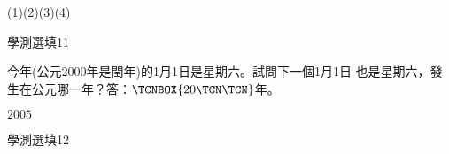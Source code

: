 \begin{QUESTIONS}
\begin{QUESTION}
\begin{QBODY}
\begin{QOPS}
				\end{QOPS}
        \end{QBODY}
        \begin{QFROMS}
        \end{QFROMS}
        \begin{QTAGS}\end{QTAGS}
        \begin{QANS}
			(1)(2)(3)(4)
        \end{QANS}
        \begin{QSOLLIST}
        \end{QSOLLIST}
        \begin{QEMPTYSPACE}
        \end{QEMPTYSPACE}
    \end{QUESTION}
\end{QUESTIONS}\begin{QUESTIONS}
    \begin{QUESTION}
        \begin{ExamInfo}{89}{學測}{選填}{11}
        \end{ExamInfo}
        \begin{ExamAnsRateInfo}{}{}{}{}
        \end{ExamAnsRateInfo}
        \begin{QBODY}
			今年(公元2000年是閏年)的1月1日是星期六。試問下一個1月1日
			也是星期六，發生在公元哪一年？答：$\TCNBOX{20\TCN\TCN}$年。
		\end{QBODY}
        \begin{QFROMS}
        \end{QFROMS}
        \begin{QTAGS}\end{QTAGS}
        \begin{QANS}
			$2005$
        \end{QANS}
        \begin{QSOLLIST}
        \end{QSOLLIST}
        \begin{QEMPTYSPACE}
        \end{QEMPTYSPACE}
    \end{QUESTION}
    \begin{QUESTION}
        \begin{ExamInfo}{89}{學測}{選填}{12}
        \end{ExamInfo}
        \begin{ExamAnsRateInfo}{}{}{}{}
        \end{ExamAnsRateInfo}
        \begin{QBODY}

\end{QBODY}
\end{QUESTION}
\end{QUESTIONS}
